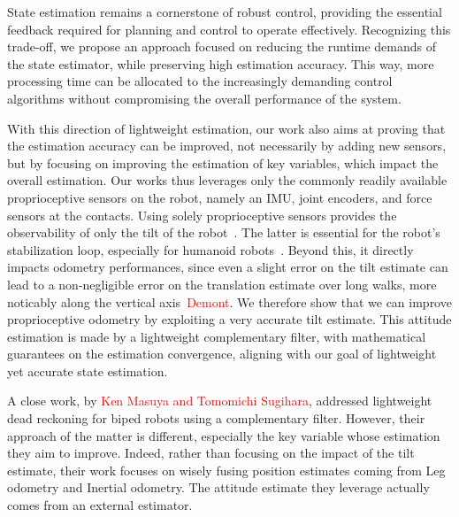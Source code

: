 \documentclass{IJCAS}
\begin{document}
State estimation remains a cornerstone of robust control, providing the essential feedback required for planning and control to operate effectively. Recognizing this trade-off, we propose an approach focused on reducing the runtime demands of the state estimator, while preserving high estimation accuracy. This way, more processing time can be allocated to the increasingly demanding control algorithms without compromising the overall performance of the system. 

With this direction of lightweight estimation, our work also aims at proving that the estimation accuracy can be improved, not necessarily by adding new sensors, but by focusing on improving the estimation of key variables, which impact the overall estimation. Our works thus leverages only the commonly readily available proprioceptive sensors on the robot, namely an IMU, joint encoders, and force sensors at the contacts. Using solely proprioceptive sensors provides the observability of only the tilt of the robot~\cite{bloesch2013FusionLegKineAndImu}. The latter is essential for the robot's stabilization loop, especially for humanoid robots~\cite{benallegue2020LyapunovStableOrientationEstimatorHumanoids}. Beyond this, it directly impacts odometry performances, since even a slight error on the tilt estimate can lead to a non-negligible error on the translation estimate over long walks, more noticably along the vertical axis~\textcolor{red}{Demont}. We therefore show that we can improve proprioceptive odometry by exploiting a very accurate tilt estimate. This attitude estimation is made by a lightweight complementary filter, with mathematical guarantees on the estimation convergence, aligning with our goal of lightweight yet accurate state estimation.

A close work, by \textcolor{red}{Ken Masuya and Tomomichi Sugihara}, addressed lightweight dead reckoning for biped robots using a complementary filter. However, their approach of the matter is different, especially the key variable whose estimation they aim to improve. Indeed, rather than focusing on the impact of the tilt estimate, their work focuses on wisely fusing position estimates coming from Leg odometry and Inertial odometry. The attitude estimate they leverage actually comes from an external estimator. 
\end{document}
